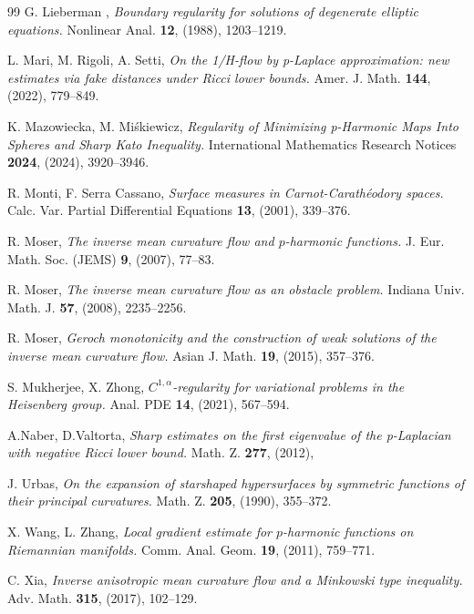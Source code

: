 \documentclass[10pt]{amsart}
\numberwithin{equation}{section}
\theoremstyle{definition}
\begin{document}
\begin{thebibliography}{99}
{\sc G. Lieberman} ,
{\em Boundary regularity for solutions of degenerate elliptic equations.}
Nonlinear Anal. {\bf 12}, (1988), 1203--1219.

{\sc L. Mari, M. Rigoli, A. Setti},
{\em On the 1/H-flow by p-Laplace approximation: new estimates via fake distances under Ricci lower bounds.} 
Amer. J. Math. {\bf 144}, (2022), 779--849. 

{\sc K. Mazowiecka, M. Mi\'skiewicz},
{\em Regularity of Minimizing p-Harmonic Maps Into Spheres and Sharp Kato Inequality.} 
International Mathematics Research Notices {\bf 2024}, (2024), 3920--3946.

{\sc R. Monti, F. Serra Cassano},
{\em Surface measures in Carnot-Carath\'{e}odory spaces.}
Calc. Var. Partial Differential Equations {\bf 13}, (2001), 339--376. 

{\sc R. Moser}, 
{\em The inverse mean curvature flow and $p$-harmonic functions.} 
J. Eur. Math. Soc. (JEMS) {\bf 9}, (2007), 77--83.

{\sc R. Moser},
{\em The inverse mean curvature flow as an obstacle problem.}
 Indiana Univ. Math. J. {\bf 57}, (2008), 2235--2256.

{\sc R. Moser},
{\em Geroch monotonicity and the construction of weak solutions of the inverse mean curvature flow.}
Asian J. Math. {\bf 19}, (2015), 357--376. 

{\sc S. Mukherjee, X. Zhong},
{\em $C^{1,\alpha}$-regularity for variational problems in the Heisenberg group.}
Anal. PDE {\bf 14}, (2021), 567--594.

{\sc A.Naber, D.Valtorta}, {\em Sharp estimates on the first eigenvalue of the p-Laplacian with negative Ricci lower bound.}
Math. Z. {\bf 277}, (2012), 

{\sc J. Urbas}, 
{\em On the expansion of starshaped hypersurfaces by symmetric functions of their principal curvatures.}
 Math. Z. {\bf 205}, (1990), 355--372.


{\sc X. Wang, L.  Zhang},  {\em Local gradient estimate for $p$-harmonic functions on Riemannian manifolds.} 
Comm. Anal. Geom. {\bf 19}, (2011), 759--771.

{\sc C. Xia}, 
{\em Inverse anisotropic mean curvature flow and a Minkowski type inequality.}
Adv. Math. {\bf 315}, (2017), 102--129.

\end{thebibliography}
\end{document}
